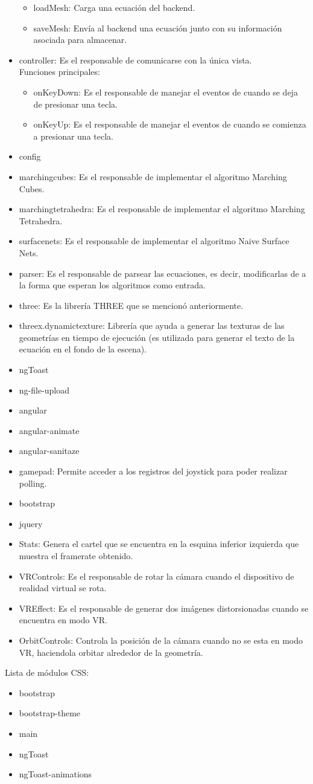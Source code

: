 \documentclass[12pt]{article}
\begin{document}
\begin{itemize}
\begin{itemize}
	\item loadMesh: Carga una ecuación del backend.
	\item saveMesh: Envía al backend una ecuación junto con su información asociada para almacenar.
	\end{itemize}
\item controller: Es el responsable de comunicarse con la única vista.
	\\Funciones principales:
	\begin{itemize}
	\item onKeyDown: Es el responsable de manejar el eventos de cuando se deja de presionar una tecla.
	\item onKeyUp: Es el responsable de manejar el eventos de cuando se comienza a presionar una tecla.
	\end{itemize}
\item config
\item marchingcubes: Es el responsable de implementar el algoritmo Marching Cubes.
\item marchingtetrahedra: Es el responsable de implementar el algoritmo Marching Tetrahedra.
\item surfacenets: Es el responsable de implementar el algoritmo Naive Surface Nets.
\item parser: Es el responsable de parsear las ecuaciones, es decir, modificarlas de a la forma que esperan los algoritmos como entrada.
\item three: Es la librería THREE que se mencionó anteriormente.
\item threex.dynamictexture: Librería que ayuda a generar las texturas de las geometrías en tiempo de ejecución (es utilizada para generar el texto de la ecuación en el fondo de la escena).
\item ngToast
\item ng-file-upload
\item angular
\item angular-animate
\item angular-sanitaze
\item gamepad: Permite acceder a los registros del joystick para poder realizar polling.
\item bootstrap
\item jquery
\item Stats: Genera el cartel que se encuentra en la esquina inferior izquierda que muestra el framerate obtenido.
\item VRControls: Es el responsable de rotar la cámara cuando el dispositivo de realidad virtual se rota.
\item VREffect: Es el responsable de generar dos imágenes distorsionadas cuando se encuentra en modo VR.
\item OrbitControls: Controla la posición de la cámara cuando no se esta en modo VR, haciendola orbitar alrededor de la geometría.
\end{itemize}
Lista de módulos CSS:
\begin{itemize}
\item bootstrap
\item bootstrap-theme
\item main
\item ngToast
\item ngToast-animations
\end{itemize}
\end{document}
